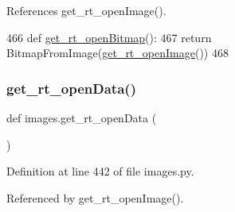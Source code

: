 References get\+\_\+rt\+\_\+open\+Image().


\begin{DoxyCode}
466 \textcolor{keyword}{def }\hyperlink{namespaceimages_a81c594953339efc7f92c04aa49ba9d37}{get\_rt\_openBitmap}():
467     \textcolor{keywordflow}{return} BitmapFromImage(\hyperlink{namespaceimages_a82d1ce2172b3d643c512f8711182e732}{get\_rt\_openImage}())
468 
\end{DoxyCode}
\mbox{\label{namespaceimages_addfd58d6ab4de5a4b3eca7b6f057d234}} 
\subsubsection{\texorpdfstring{get\+\_\+rt\+\_\+open\+Data()}{get\_rt\_openData()}}
{\footnotesize\ttfamily def images.\+get\+\_\+rt\+\_\+open\+Data (\begin{DoxyParamCaption}{ }\end{DoxyParamCaption})}



Definition at line 442 of file images.\+py.



Referenced by get\+\_\+rt\+\_\+open\+Image().


